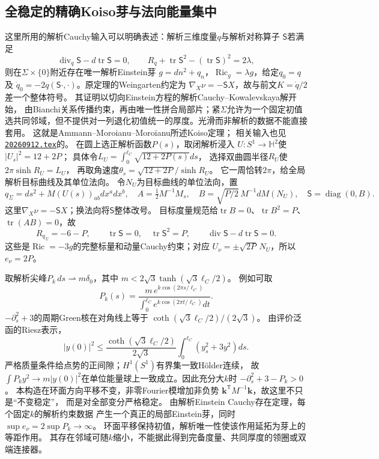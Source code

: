 \documentclass[UTF8,a4paper,11pt,fontset=fandol]{ctexart}
\numberwithin{equation}{section}
\theoremstyle{definition}
\newcommand{\Ric}{\operatorname{Ric}}
\newcommand{\tr}{\operatorname{tr}}
\begin{document}
\subsection{全稳定的精确Koiso芽与法向能量集中}
这里所用的解析Cauchy输入可以明确表述：解析三维度量$q$与解析对称算子
$\mathsf S$若满足
\[
 \operatorname{div}_q\mathsf S-d\tr\mathsf S=0,\qquad
 R_q+\tr\mathsf S^2-(\tr\mathsf S)^2=2\lambda,
\]
则在$\Sigma\times\{0\}$附近存在唯一解析Einstein芽
$g=dn^2+q_n$，$\Ric_g=\lambda g$，给定$q_0=q$及
$\dot q_0=-2q(\mathsf S\cdot,\cdot)$。原定理的Weingarten约定为
$\nabla_X\nu=-\mathsf S X$，故与前文$K=\dot q/2$差一个整体符号。
其证明以切向Einstein方程的解析Cauchy--Kowalevskaya解开始，
由Bianchi关系传播约束，再由唯一性拼合局部片；紧$\Sigma$允许为一个固定初值
选共同邻域，但不提供对一列退化初值统一的厚度。光滑而非解析的数据不能直接套用。
这就是Ammann--Moroianu--Moroianu所述Koiso定理\cite[Theorem 2.1]{Ammann}；
相关输入也见
\href{20260912.tex}{\texttt{20260912.tex}}的。
在圆上选正解析函数$P(s)$，取闭解析浸入
$U:S^1\to\mathbb H^2$使$|U_s|^2=12+2P$；
具体令$L_U=\int_0^{\ell_C}\sqrt{12+2P(s)}ds$，
选择双曲圆半径$R_U$使$2\pi\sinh R_U=L_U$，
再取角速度$\theta_s=\sqrt{12+2P}/\sinh R_U$。
它一周恰转$2\pi$，给全局解析目标曲线及其单位法向。
令$N_U$为目标曲线的单位法向，置
\[
 q_\Sigma=ds^2+M(U(s))_{ab}dx^adx^b,
 \quad A=\tfrac12M^{-1}M_s,
 \quad B=\sqrt{P/2}\,M^{-1}dM(N_U),
 \quad \mathsf S=\operatorname{diag}(0,B).
\]
这里$\nabla_X\nu=-\mathsf S X$；换法向将$\mathsf S$整体改号。
目标度量规范给$\tr B=0$、$\tr B^2=P$、$\tr(AB)=0$，故
\[
 R_{q_\Sigma}=-6-P,\qquad\tr\mathsf S=0,
 \quad\tr\mathsf S^2=P,\qquad
 \operatorname{div}\mathsf S-d\tr\mathsf S=0.
\]
这些是$\Ric=-3g$的完整标量和动量Cauchy约束；对应
$U_\nu=\pm\sqrt{2P}\,N_U$，所以$e_\nu=2P$。

取解析尖峰$P_k\,ds\rightharpoonup m\delta_0$，其中
$m<2\sqrt3\tanh(\sqrt3\ell_C/2)$。
例如可取
\[
 P_k(s)=\frac{m\,e^{k\cos(2\pi s/\ell_C)}}
                 {\int_0^{\ell_C}e^{k\cos(2\pi t/\ell_C)}dt}.
\]
$-\partial_s^2+3$的周期Green核在对角线上等于
$\coth(\sqrt3\ell_C/2)/(2\sqrt3)$。
由评价泛函的Riesz表示，
\[
 |y(0)|^2\le
 \frac{\coth(\sqrt3\ell_C/2)}{2\sqrt3}
 \int_0^{\ell_C}(y_s^2+3y^2)ds.
\]
严格质量条件给点势的正间隙；$H^1(S^1)$有界集一致Hölder连续，
故$\int P_ky^2\to m|y(0)|^2$在单位能量球上一致成立。因此充分大$k$时
$-\partial_s^2+3-P_k>0$。
本构造在环面方向平移不变，非零Fourier模增加非负势
$\mathbf k^{\mathsf T}M^{-1}\mathbf k$，故这里不只是“不变稳定”，
而是对全部变分严格稳定。
由解析Einstein Cauchy存在定理，每个固定$k$的解析约束数据
产生一个真正的局部Einstein芽，同时$\sup e_\nu=2\sup P_k\to\infty$。
环面平移保持初值，解析唯一性使该作用延拓为芽上的等距作用。
其存在邻域可随$k$缩小，不能据此得到完备度量、共同厚度的领圈或双端连接器。
\end{document}
